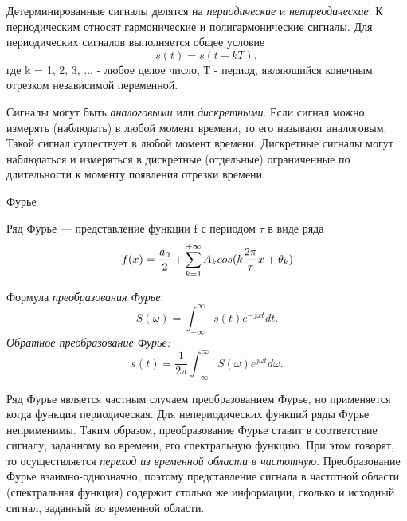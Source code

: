 \documentclass[a4paper,12pt]{article}
\begin{document}
Детерминированные сигналы делятся на  \textit{периодические} и \textit{непиреодические}. К периодическим относят гармонические и полигармонические сигналы. Для периодических сигналов выполняется общее условие 
\begin{equation}
s(t) = s(t + kT),
\end{equation}
 где k = 1, 2, 3, ... - любое целое число, Т - период, являющийся конечным отрезком независимой переменной.

Сигналы могут быть \textit{аналоговыми} или \textit{дискретными}. Если сигнал можно измерять (наблюдать) в любой момент времени, то его называют аналоговым. Такой сигнал существует в любой момент времени. Дискретные сигналы могут наблюдаться и измеряться в дискретные (отдельные) ограниченные по длительности к моменту появления отрезки времени.

{ Фурье}

Ряд Фурье — представление функции  f с периодом $\tau$ в виде ряда
\begin{equation}
f(x) = {a_0\over 2} + \sum_{k=1}^{+\infty}A_k cos(k{2\pi\over 
\tau}x + \theta_k)
\end{equation}

Формула \textit{преобразования Фурье}:
\begin{equation}
S(\omega) = \int_{-\infty}^{\infty} s(t)e^{-j\omega t} dt.
\end{equation}
\textit{Обратное преобразование Фурье:}
\begin{equation}
s(t) = \frac{1}{2\pi} \int_{-\infty}^{\infty} S(\omega)e^{j\omega t} d\omega.
\end{equation}

Ряд Фурье является частным случаем преобразованием Фурье, но применяется когда функция периодическая. Для непериодических функций ряды Фурье неприменимы. Таким образом, преобразование Фурье ставит в соответствие сигналу, заданному во времени, его спектральную функцию. При этом говорят, то осуществляется \textit{переход из временной области в частотную}. Преобразование Фурье взаимно-однозначно, поэтому представление сигнала в частотной области (спектральная функция) содержит столько же информации, сколько и исходный сигнал, заданный во временной области.
\newpage
\end{document}

